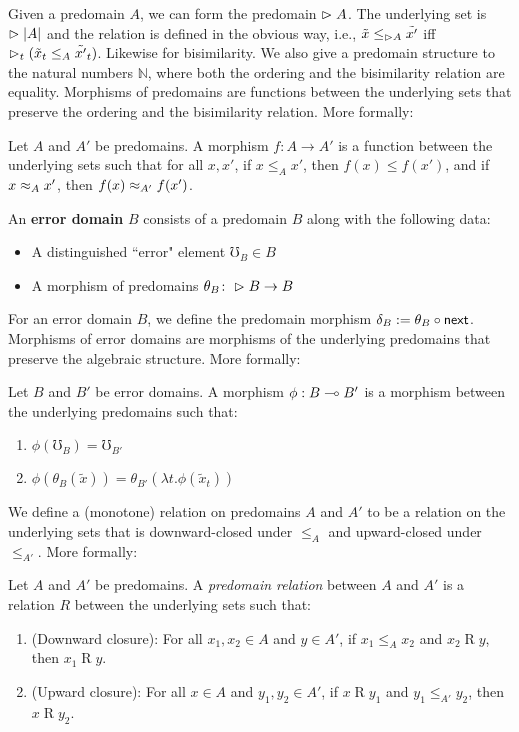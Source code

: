Given a predomain $A$, we can form the predomain $\vartriangleright A$. The underlying set
is $\vartriangleright |A|$ and the relation is defined in the obvious way, i.e., $\tilde{x}
\le_{\vartriangleright A} \tilde{x'}$ iff $\vartriangleright_t(\tilde{x}_t \le_A \tilde{x'}_t)$.
Likewise for bisimilarity.
%
We also give a predomain structure to the natural numbers $\mathbb{N}$, where
both the ordering and the bisimilarity relation are equality.
%
Morphisms of predomains are functions between the underlying sets that preserve
the ordering and the bisimilarity relation. More formally:
%
\begin{definition}
Let $A$ and $A'$ be predomains.
A morphism $f : A \to A'$ is a function between the underlying sets such that for all $x, x'$,
if $x \le_A x'$, then $f(x) \le f(x')$, and if $x \approx_A x'$, then $f(x) \approx_{A'} f(x')$.
\end{definition}
%
\begin{definition}
An \textbf{error domain} $B$ consists of a predomain $B$ along with the following data:
\begin{itemize}
    \item A distinguished ``error" element $\mho_B \in B$
    \item A morphism of predomains $\theta_B \colon \vartriangleright B \to B$
\end{itemize}
\end{definition}
%
For an error domain $B$, we define the predomain morphism $\delta_B := \theta_B
\circ \mathsf{next}$.
%
Morphisms of error domains are morphisms of the underlying predomains that
preserve the algebraic structure. More formally:
%
\begin{definition}
Let $B$ and $B'$ be error domains.
A morphism $\phi : B \mathrel{\multimap} B'$ is a morphism between the underlying predomains such that:
\begin{enumerate}
    \item $\phi(\mho_B) = \mho_{B'}$
    \item $\phi(\theta_B(\tilde{x})) = \theta_{B'}(\lambda t. \phi(\tilde{x}_t))$
\end{enumerate}
\end{definition}
%
We define a (monotone) relation on predomains $A$ and $A'$ to be a relation on
the underlying sets that is downward-closed under $\le_A$ and upward-closed
under $\le_{A'}$. More formally:
%
\begin{definition}
Let $A$ and $A'$ be predomains. A \emph{predomain relation} between $A$ and $A'$
is a relation $R$ between the underlying sets such that:
\begin{enumerate}
    \item (Downward closure): For all $x_1, x_2 \in A$ and $y \in A'$,
    if $x_1 \le_A x_2$ and $x_2 \mathbin{R} y$, then $x_1 \mathbin{R} y$.
    \item (Upward closure): For all $x \in A$ and $y_1, y_2 \in A'$,
    if $x \mathbin{R} y_1$ and $y_1 \le_{A'} y_2$, then $x \mathbin{R} y_2$.
\end{enumerate}
\end{definition}
